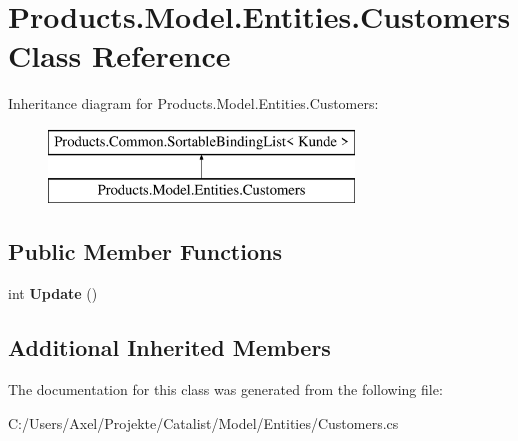 \hypertarget{class_products_1_1_model_1_1_entities_1_1_customers}{}\section{Products.\+Model.\+Entities.\+Customers Class Reference}
\label{class_products_1_1_model_1_1_entities_1_1_customers}
Inheritance diagram for Products.\+Model.\+Entities.\+Customers\+:\begin{figure}[H]
\begin{center}
\leavevmode
\includegraphics[height=2.000000cm]{class_products_1_1_model_1_1_entities_1_1_customers}
\end{center}
\end{figure}
\subsection*{Public Member Functions}
\begin{DoxyCompactItemize}
\item 
int {\bfseries Update} ()\hypertarget{class_products_1_1_model_1_1_entities_1_1_customers_a32f00bb6c593bfc3a0848396982f09b4}{}\label{class_products_1_1_model_1_1_entities_1_1_customers_a32f00bb6c593bfc3a0848396982f09b4}

\end{DoxyCompactItemize}
\subsection*{Additional Inherited Members}


The documentation for this class was generated from the following file\+:\begin{DoxyCompactItemize}
\item 
C\+:/\+Users/\+Axel/\+Projekte/\+Catalist/\+Model/\+Entities/Customers.\+cs\end{DoxyCompactItemize}
